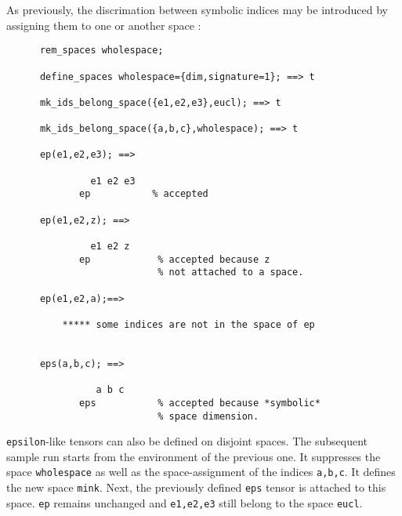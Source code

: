 As previously, the discrimation between symbolic indices
%
may be introduced
by assigning them to one or another space%
:
\begin{verbatim}
      rem_spaces wholespace;

      define_spaces wholespace={dim,signature=1}; ==> t

      mk_ids_belong_space({e1,e2,e3},eucl); ==> t

      mk_ids_belong_space({a,b,c},wholespace); ==> t

      ep(e1,e2,e3); ==>

               e1 e2 e3
             ep           % accepted

      ep(e1,e2,z); ==>

               e1 e2 z
             ep            % accepted because z
                           % not attached to a space.

      ep(e1,e2,a);==>

          ***** some indices are not in the space of ep


      eps(a,b,c); ==>

                a b c
             eps           % accepted because *symbolic*
                           % space dimension.
\end{verbatim}
\texttt{epsilon}-like tensors can also be defined on disjoint spaces.
The subsequent sample run starts from the environment of the previous one.
It suppresses the space \texttt{wholespace} as well as the
space-assignment of the indices \texttt{a,b,c}. It  defines the new space
\texttt{mink}. Next, the previously defined  \texttt{eps} tensor is attached
to this space. \texttt{ep} remains unchanged and \texttt{e1,e2,e3} still
belong to the space \texttt{eucl}.
